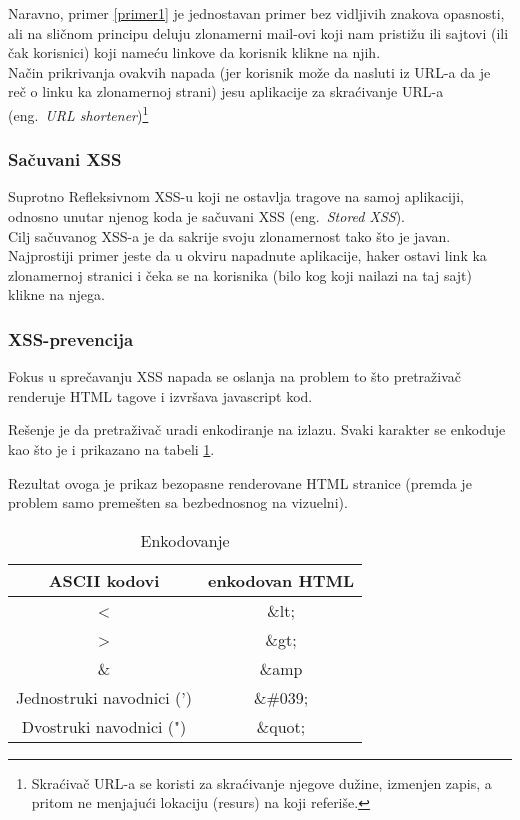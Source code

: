\documentclass[a4paper]{article}
\begin{document}
 Naravno, primer \ref{primer1} je jednostavan primer bez vidljivih znakova opasnosti, ali na sličnom principu deluju zlonamerni mail-ovi koji nam pristižu ili sajtovi (ili čak korisnici) koji nameću linkove da korisnik klikne na njih.\\
Način prikrivanja ovakvih napada (jer korisnik može da nasluti iz URL-a da je reč o linku ka zlonamernoj strani) jesu aplikacije za skraćivanje URL-a (eng.~{\em URL shortener})\footnote{Skraćivač URL-a se koristi za skraćivanje njegove dužine, izmenjen zapis, a pritom ne menjajući lokaciju (resurs) na koji referiše.}

\subsubsection{Sačuvani XSS}

Suprotno Refleksivnom XSS-u koji ne ostavlja tragove na samoj aplikaciji, odnosno unutar njenog koda je sačuvani XSS (eng.~{\em Stored XSS}).\\ Cilj sačuvanog XSS-a je da sakrije svoju zlonamernost tako što je javan. Najprostiji primer jeste da u okviru napadnute aplikacije, haker ostavi link ka zlonamernoj stranici i čeka se na korisnika (bilo kog koji nailazi na taj sajt) klikne na njega.

\subsubsection{XSS-prevencija}

Fokus u sprečavanju XSS\cite{XSS_prev} napada se oslanja na problem to što pretraživač renderuje HTML tagove i izvršava javascript kod.  

Rešenje je da pretraživač uradi enkodiranje na izlazu. Svaki karakter se enkoduje kao što je i prikazano na tabeli \ref{kodiranje}.

Rezultat ovoga je prikaz bezopasne renderovane HTML stranice (premda je problem samo premešten sa bezbednosnog na vizuelni).


\begin{table}[ht]

\begin{center}
\caption{Enkodovanje}
\begin{tabular}{ | c | c | }
\hline
	\rowcolor{yellow}
\textbf{ASCII kodovi} & \textbf{enkodovan HTML} \\
	\hline
 < & \&lt; \\ 
 \hline
 > & \&gt; \\  
 \hline
 \& & \&amp \\
 \hline
 Jednostruki navodnici (') & \&\#039;\\
 \hline
 Dvostruki navodnici (") & \&quot;\\  
 \hline  
\end{tabular}

\label{kodiranje}
\end{center}
\end{table}
\end{document}
